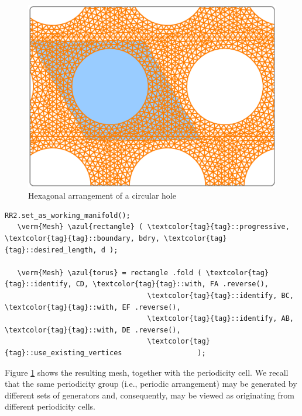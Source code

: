 \begin{figure}[ht] \centering
  \includegraphics[width=125mm]{hexa-round-hole.eps}
  \caption{Hexagonal arrangement of a circular hole}
  \label{\numb section 7.\numb fig 13}
\end{figure}

\begin{Verbatim}[commandchars=\\\{\},formatcom=\small\tt,frame=single,
   label=parag-\ref{\numb section 7.\numb parag 18}.cpp,rulecolor=\color{coment},
   baselinestretch=0.94,framesep=2mm                                             ]
   RR2.set_as_working_manifold();
   \verm{Mesh} \azul{rectangle} ( \textcolor{tag}{tag}::progressive, \textcolor{tag}{tag}::boundary, bdry, \textcolor{tag}{tag}::desired_length, d );

   \verm{Mesh} \azul{torus} = rectangle .fold ( \textcolor{tag}{tag}::identify, CD, \textcolor{tag}{tag}::with, FA .reverse(),
                                  \textcolor{tag}{tag}::identify, BC, \textcolor{tag}{tag}::with, EF .reverse(),
                                  \textcolor{tag}{tag}::identify, AB, \textcolor{tag}{tag}::with, DE .reverse(),
                                  \textcolor{tag}{tag}::use_existing_vertices                  );
\end{Verbatim}

Figure \ref{\numb section 7.\numb fig 13} shows the resulting mesh, together with the
periodicity cell.
We recall that the same periodicity group (i.e., periodic arrangement) may be generated
by different sets of generators and, consequently, may be viewed as originating
from different periodicity cells.


